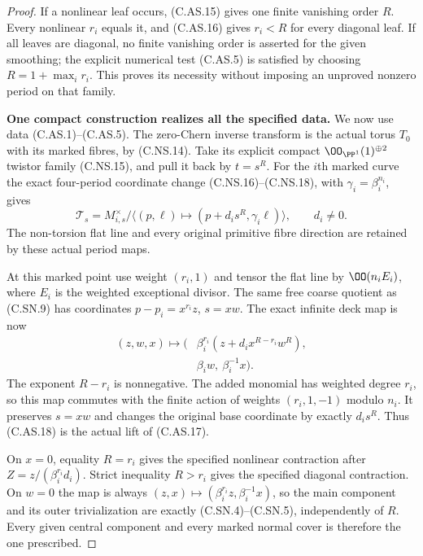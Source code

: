 \begin{proof}
If a nonlinear leaf occurs, (C.AS.15)
gives one finite vanishing order $R$.
Every nonlinear $r_i$ equals it, and
(C.AS.16) gives $r_i<R$ for every
diagonal leaf. If all leaves are
diagonal, no finite vanishing order
is asserted for the given smoothing;
the explicit numerical test (C.AS.5)
is satisfied by choosing
$R=1+\max_i r_i$. This proves its
necessity without imposing an unproved
nonzero period on that family.

\par\medskip\noindent\textbf{One compact construction realizes all the specified data.}
We now use data (C.AS.1)--(C.AS.5).
The zero-Chern inverse transform is
the actual torus $T_0$ with its marked
fibres, by (C.NS.14). Take its explicit
compact $\OO_{\PP^1}(1)^{\oplus2}$
twistor family (C.NS.15), and pull it
back by $t=s^R$. For the $i$th marked
curve the exact four-period coordinate
change (C.NS.16)--(C.NS.18), with
$\gamma_i=\beta_i^{n_i}$, gives
\[
 \mathcal T_s=M_{i,s}^{\times}/
   \langle(p,\ell)\mapsto(p+d_i s^R,\gamma_i\ell)\rangle,
                    \qquad d_i\ne0 .                  \tag{C.AS.17}
\]
The non-torsion flat line and every
original primitive fibre direction
are retained by these actual period
maps.

At this marked point use weight
$(r_i,1)$ and tensor the flat line
by $\OO(n_iE_i)$, where $E_i$ is
the weighted exceptional divisor.
The same free coarse quotient as
(C.SN.9) has coordinates
$p-p_i=x^{r_i}z$, $s=xw$.
The exact infinite deck map is now
\[
 \begin{split}
 (z,w,x)\longmapsto\bigl(&
   \beta_i^{r_i}(z+d_i x^{R-r_i}w^R),\\
   &\beta_iw,\ \beta_i^{-1}x\bigr).
 \end{split}                                             \tag{C.AS.18}
\]
The exponent $R-r_i$ is nonnegative.
The added monomial has weighted degree
$r_i$, so this map commutes with the
finite action of weights
$(r_i,1,-1)$ modulo $n_i$. It preserves
$s=xw$ and changes the original base
coordinate by exactly $d_i s^R$.
Thus (C.AS.18) is the actual lift
of (C.AS.17).

On $x=0$, equality $R=r_i$ gives the
specified nonlinear contraction after
$Z=z/(\beta_i^{r_i}d_i)$. Strict
inequality $R>r_i$ gives the specified
diagonal contraction. On $w=0$ the
map is always
$(z,x)\mapsto(\beta_i^{r_i}z,\beta_i^{-1}x)$,
so the main component and its outer
trivialization are exactly
(C.SN.4)--(C.SN.5), independently of
$R$. Every given central component
and every marked normal cover is
therefore the one prescribed.


\end{proof}
